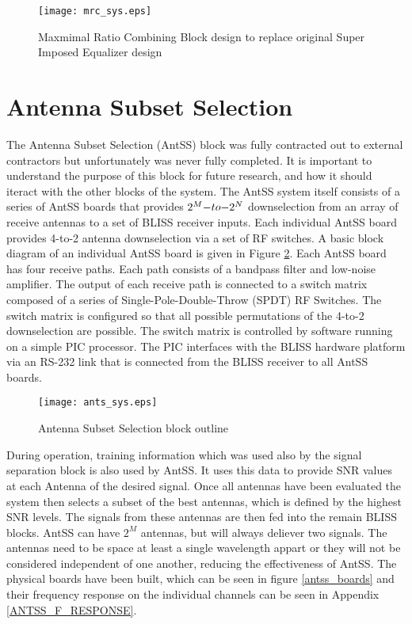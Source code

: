 \begin{figure}[!ht]\label{mrc_sys}
\centering
\texttt{[image: mrc\_sys.eps]}
\caption{Maxmimal Ratio Combining Block design to replace original Super Imposed Equalizer design}
\end{figure}

\section{Antenna Subset Selection}

The Antenna Subset Selection (AntSS) block was fully contracted out to external contractors but unfortunately was never fully completed.  It is important to understand the purpose of this block for future research, and how it should iteract with the other blocks of the system.  The AntSS system itself consists of a series of AntSS boards that provides \(2^{M}$$ -to-$$2^{N}\) downselection from an array of receive antennas to a set of BLISS receiver inputs. Each individual AntSS board provides 4-to-2 antenna downselection via a set of RF switches. A basic block diagram of an individual AntSS board is given in Figure \ref{ants_sys}.  Each AntSS board has four receive paths. Each path consists of a bandpass filter and low-noise amplifier. The output of each receive path is connected to a switch matrix composed of a series of Single-Pole-Double-Throw (SPDT) RF Switches. The switch matrix is configured so that all possible permutations of the 4-to-2 downselection are possible. The switch matrix is controlled by software running on a simple PIC processor. The PIC interfaces with the BLISS hardware platform via an RS-232 link that is connected from the BLISS receiver to all AntSS boards.\\

\begin{figure}[!ht]\label{ants_sys}
\centering
\texttt{[image: ants\_sys.eps]}
\caption{Antenna Subset Selection block outline}
\end{figure}

During operation, training information which was used also by the signal separation block is also used by AntSS.  It uses this data to provide SNR values at each Antenna of the desired signal.  Once all antennas have been evaluated the system then selects a subset of the best antennas, which is defined by the highest SNR levels.  The signals from these antennas are then fed into the remain BLISS blocks.  AntSS can have \(2^{M}\) antennas, but will always deliever two signals.  The antennas need to be space at least a single wavelength appart or they will not be considered independent of one another, reducing the effectiveness of AntSS.  The physical boards have been built, which can be seen in figure \ref{antss_boards} and their frequency response on the individual channels can be seen in Appendix \ref{ANTSS_F_RESPONSE}.\\

